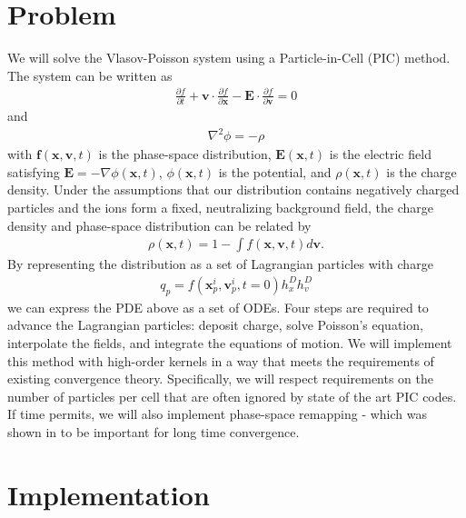 \documentclass[aps,12pt, notitlepage]{revtex4-1}
\def\b{\mathbf}\def\e{\epsilon}
\def\f{\b{f}}
\renewcommand{\=}[1]{\overline{#1}}
\newcommand{\pder}[2]{\frac{\partial{#1}}{\partial{#2}}}
\begin{document}

\section{Problem}
We will solve the Vlasov-Poisson system using a Particle-in-Cell (PIC) method. 
The system can be written as
\begin{align*}
\pder{f}{t} + \pmb{v} \cdot \pder{f}{\pmb{x}} - \pmb{E} \cdot \pder{f}{\pmb{v}} = 0
\end{align*}
and 
\begin{align*}
\nabla^2 \phi = -\rho
\end{align*}
with $\f(\pmb{x}, \pmb{v}, t)$ is the phase-space distribution, $\pmb{E}(\pmb{x}, t)$ is the electric field satisfying $\pmb{E} = -\nabla \phi(\pmb{x}, t)$, $\phi(\pmb{x}, t)$ is the potential, and $\rho(\pmb{x}, t)$ is the charge density. 
Under the assumptions that our distribution contains negatively charged particles and the ions form a fixed, neutralizing background field, the charge density and phase-space distribution can be related by 
\begin{align*}
\rho(\pmb{x}, t) = 1 - \int f(\pmb{x}, \pmb{v}, t) d\pmb{v}. 
\end{align*}
By representing the distribution as a set of Lagrangian particles with charge 
\begin{align*}
q_p = f(\pmb{x}_p^i, \pmb{v}_p^i, t = 0) h_x^D h_v^D
\end{align*}
we can express the PDE above as a set of ODEs. 
Four steps are required to advance the Lagrangian particles: deposit charge, solve Poisson's equation, interpolate the fields, and integrate the equations of motion.  
We will implement this method with high-order kernels in a way that meets the requirements of existing convergence theory.
Specifically, we will respect requirements on the number of particles per cell that are often ignored by state of the art PIC codes.    
If time permits, we will also implement phase-space remapping - which was shown in \cite{wang2011particle} to be important for long time convergence. 

\section{Implementation}
\end{document}
